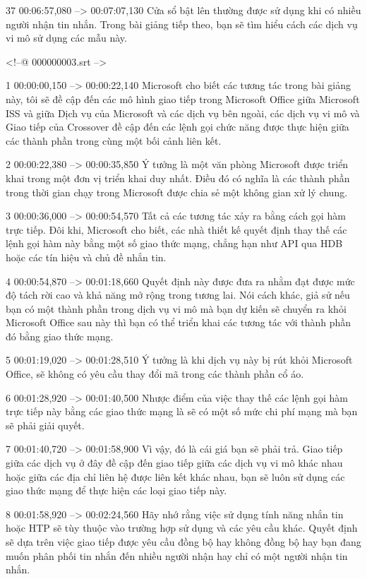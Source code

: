 37
00:06:57,080 --> 00:07:07,130
Cửa sổ bật lên thường được sử dụng khi có nhiều người nhận tin nhắn.  Trong bài giảng tiếp theo, bạn sẽ tìm hiểu cách các dịch vụ vi mô sử dụng các mẫu này.

<!--@ 000000003.srt -->

1
00:00:00,150 --> 00:00:22,140
Microsoft cho biết các tương tác trong bài giảng này, tôi sẽ đề cập đến các mô hình giao tiếp trong Microsoft Office giữa Microsoft ISS và giữa Dịch vụ của Microsoft và các dịch vụ bên ngoài, các dịch vụ vi mô và Giao tiếp của Crossover đề cập đến các lệnh gọi chức năng được thực hiện giữa các thành phần trong cùng một bối cảnh liên kết.

2
00:00:22,380 --> 00:00:35,850
Ý tưởng là một văn phòng Microsoft được triển khai trong một đơn vị triển khai duy nhất.  Điều đó có nghĩa là các thành phần trong thời gian chạy trong Microsoft được chia sẻ một không gian xử lý chung.

3
00:00:36,000 --> 00:00:54,570
Tất cả các tương tác xảy ra bằng cách gọi hàm trực tiếp.  Đôi khi, Microsoft cho biết, các nhà thiết kế quyết định thay thế các lệnh gọi hàm này bằng một số giao thức mạng, chẳng hạn như API qua HDB hoặc các tín hiệu và chủ đề nhắn tin.

4
00:00:54,870 --> 00:01:18,660
Quyết định này được đưa ra nhằm đạt được mức độ tách rời cao và khả năng mở rộng trong tương lai.  Nói cách khác, giả sử nếu bạn có một thành phần trong dịch vụ vi mô mà bạn dự kiến ​​sẽ chuyển ra khỏi Microsoft Office sau này thì bạn có thể triển khai các tương tác với thành phần đó bằng giao thức mạng.

5
00:01:19,020 --> 00:01:28,510
Ý tưởng là khi dịch vụ này bị rút khỏi Microsoft Office, sẽ không có yêu cầu thay đổi mã trong các thành phần cổ áo.

6
00:01:28,920 --> 00:01:40,500
Nhược điểm của việc thay thế các lệnh gọi hàm trực tiếp này bằng các giao thức mạng là sẽ có một số mức chi phí mạng mà bạn sẽ phải giải quyết.

7
00:01:40,720 --> 00:01:58,900
Vì vậy, đó là cái giá bạn sẽ phải trả.  Giao tiếp giữa các dịch vụ ở đây đề cập đến giao tiếp giữa các dịch vụ vi mô khác nhau hoặc giữa các địa chỉ liên hệ được liên kết khác nhau, bạn sẽ luôn sử dụng các giao thức mạng để thực hiện các loại giao tiếp này.

8
00:01:58,920 --> 00:02:24,560
Hãy nhớ rằng việc sử dụng tính năng nhắn tin hoặc HTP sẽ tùy thuộc vào trường hợp sử dụng và các yêu cầu khác.  Quyết định sẽ dựa trên việc giao tiếp được yêu cầu đồng bộ hay không đồng bộ hay bạn đang muốn phân phối tin nhắn đến nhiều người nhận hay chỉ có một người nhận tin nhắn.

